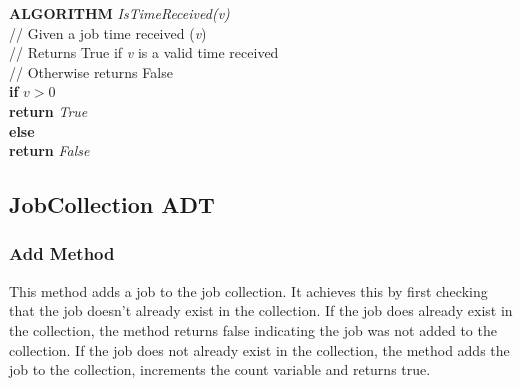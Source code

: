 \documentclass[12pt,a4paper]{article}
\begin{document}
				\textbf{ALGORITHM} \textit{IsTimeReceived(v)}\\
				\null\hspace{1cm}// Given a job time received (\textit{v})\\
				\null\hspace{1cm}// Returns True if \textit{v} is a valid time received\\
				\null\hspace{1cm}// Otherwise returns False\\
				\null\hspace{1cm}\textbf{if} \textit{$v > 0$}\\
				\null\hspace{2cm}\textbf{return} \textit{True}\\
				\null\hspace{1cm}\textbf{else}\\
				\null\hspace{2cm}\textbf{return} \textit{False}
		
		\newpage
			
		\subsection{JobCollection ADT}
			\subsubsection{Add Method}
				This method adds a job to the job collection. It achieves this by first checking that the job 
				doesn't already exist in the collection. If the job does already exist in the collection, the 
				method returns false indicating the job was not added to the collection. If the job does not 
				already exist in the collection, the method adds the job to the collection, increments the count 
				variable and returns true.\\
				
\end{document}
